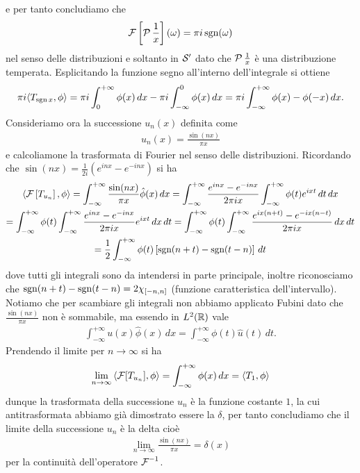 e per tanto concludiamo che 
\begin{align}
  \F\left[ \P\frac1x \right](\omega) = \pi i \sgn(\omega)
\end{align}
nel senso delle distribuzioni e soltanto in $ \S' $ dato che $ \P\frac1x $ è una distribuzione temperata. Esplicitando la funzione segno 
all'interno dell'integrale si ottiene 
\begin{align}
  \pi i\sc{T_{\sgn x}, \phi} = \pi i  \int_{0}^{+\infty}  \phi(x) \, dx - \pi i  \int_{-\infty}^{0}  \phi(x) \, dx 
  = \pi i \int_{-\infty}^{+\infty} \phi(x) - \phi(-x) \, dx.
\end{align}
Consideriamo ora la successione $ u_n(x) $ definita come 
\begin{align}
  u_n(x) = \frac{\sin(nx)}{\pi x}
\end{align}
e calcoliamone la trasformata di Fourier nel senso delle distribuzioni. Ricordando che $ \sin(nx) = \frac1{2i} \left( e^{inx} -e^{-inx} \right) $ si ha
\begin{gather}
  \sca{\F\left[ T_{u_n} \right], \phi} = \int_{-\infty}^{+\infty} \frac{\sin(nx)}{\pi x} \hat{\phi}(x) \, dx 
  = \int_{-\infty}^{+\infty} \frac{e^{inx} -e^{-inx}}{2\pi i x} \int_{-\infty}^{+\infty} \phi(t) e^{ixt} \,dt\,dx
  \\
  = \int_{-\infty}^{+\infty} \phi(t) \int_{-\infty}^{+\infty} \frac{e^{inx} -e^{-inx}}{2\pi i x} e^{ixt} \,dx\,dt
  = \int_{-\infty}^{+\infty} \phi(t) \int_{-\infty}^{+\infty} \frac{e^{ix(n + t)} -e^{-ix(n-t)}}{2\pi i x} \,dx\,dt
  \\
  = \frac1{2}\int_{-\infty}^{+\infty} \phi(t) \left[ \sgn (n + t) - \sgn (t - n) \right] \,dt
\end{gather}
dove tutti gli integrali sono da intendersi in parte principale, inoltre riconosciamo che $ \sgn (n + t) - \sgn (t - n) = 2 \chi_{[-n, n]} $ 
(funzione caratteristica dell'intervallo). Notiamo che per scambiare gli integrali non abbiamo applicato Fubini dato che 
$ \frac{\sin(nx)}{\pi x} $ non è sommabile, ma essendo in $ L^2(\R) $ vale
\begin{align}
  \int_{-\infty}^{+\infty}  u(x) \hat{\phi}(x) \, dx = \int_{-\infty}^{+\infty}  \phi(t) \hat{u}(t) \, dt.
\end{align} 
Prendendo il limite per 
$ n\to\infty $ si ha
\begin{align}
  \lim_{n\to\infty} \sca{\F[T_{u_n}], \phi} = \int_{-\infty}^{+\infty} \phi(x)\,dx = \sc{T_1, \phi}
\end{align}
dunque la trasformata della successione $ u_n $ è la funzione costante $ 1 $, la cui antitrasformata abbiamo già dimostrato essere la 
$ \delta $, per tanto concludiamo che il limite della successione $ u_n $ è la delta cioè
\begin{align}
  \lim_{n\to\infty} \frac{\sin(nx)}{\pi x} = \delta(x)
\end{align}
per la continuità dell'operatore $ \F^{-1} $.

